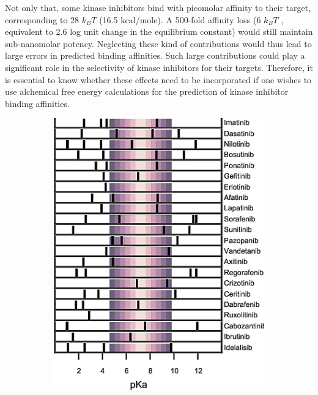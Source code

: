 \documentclass[10pt,final]{article}
\begin{document}
Not only that, some kinase inhibitors bind with picomolar affinity to their target, corresponding to 28 $k_BT$ (16.5 $\mathrm{kcal/mole}$).
%
A 500-fold affinity loss (6 $k_BT$ , equivalent to 2.6 log unit change in the equilibrium constant) would still maintain sub-nanomolar potency.
%
Neglecting these kind of contributions would thus lead to large errors in predicted binding affinities.
%
Such large contributions could play a significant role in the selectivity of kinase inhibitors for their targets.
%
Therefore, it is essential to know whether these effects need to be incorporated if one wishes to use alchemical free energy calculations for the prediction of kinase inhibitor binding affinities.

\begin{figure}[H]
\centering
\begin{subfigure}{.48\textwidth}
  \centering
	\includegraphics[width=0.95\linewidth]{figures/inhibitor-pKas.png}
	\caption{}
	\label{figure:pka-kinase}
\end{subfigure}%
\hfill{}
\begin{subfigure}{.48\textwidth}

\end{subfigure}
\end{figure}
\end{document}
